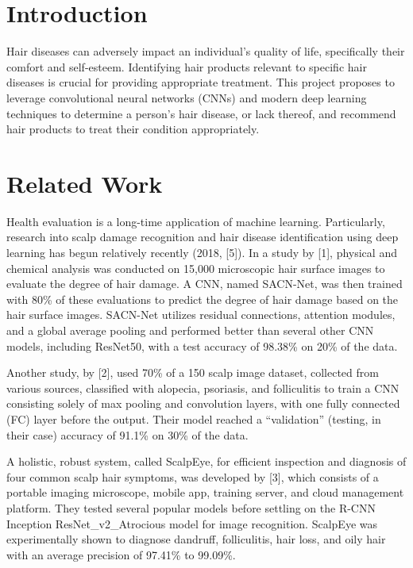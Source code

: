 \documentclass[10pt,twocolumn,letterpaper]{article}
\begin{document}
\section{Introduction}

Hair diseases can adversely impact an individual's quality of life, specifically their comfort and self-esteem. Identifying hair products relevant to specific hair diseases is crucial for providing appropriate treatment. This project proposes to leverage convolutional neural networks (CNNs) and modern deep learning techniques to determine a person's hair disease, or lack thereof, and recommend hair products to treat their condition appropriately.
\section{Related Work}
Health evaluation is a long-time application of machine learning. Particularly, research into scalp damage recognition and hair disease identification using deep learning has begun relatively recently (2018, [5]). In a study by [1], physical and chemical analysis was conducted on 15,000 microscopic hair surface images to evaluate the degree of hair damage. A CNN, named SACN-Net, was then trained with 80\% of these evaluations to predict the degree of hair damage based on the hair surface images. SACN-Net utilizes residual connections, attention modules, and a global average pooling and performed better than several other CNN models, including ResNet50, with a test accuracy of 98.38\% on 20\% of the data.

Another study, by [2], used 70\% of a 150 scalp image dataset, collected from various sources, classified with alopecia, psoriasis, and folliculitis to train a CNN consisting solely of max pooling and convolution layers, with one fully connected (FC) layer before the output. Their model reached a “validation” (testing, in their case) accuracy of 91.1\% on 30\% of the data. 

A holistic, robust system, called ScalpEye, for efficient inspection and diagnosis of four common scalp hair symptoms, was developed by [3], which consists of a portable imaging microscope, mobile app, training server, and cloud management platform. They tested several popular models before settling on the R-CNN Inception ResNet\_v2\_Atrocious model for image recognition. ScalpEye was experimentally shown to diagnose dandruff, folliculitis, hair loss, and oily hair with an average precision of 97.41\% to 99.09\%.
\end{document}
